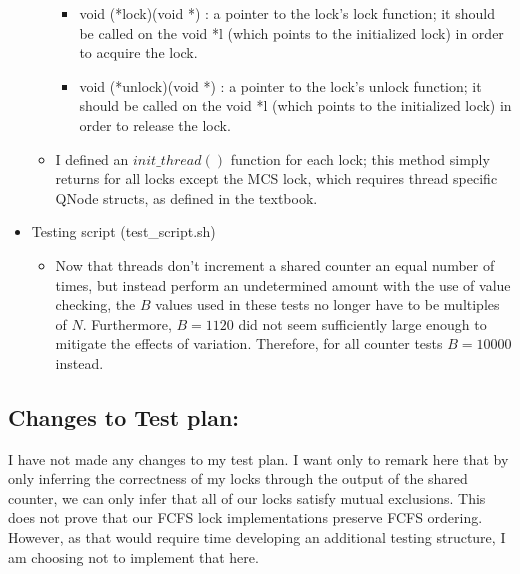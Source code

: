 \documentclass[]{article}
\begin{document}
\begin{itemize}
\begin{itemize}
\begin{itemize}
			\item void (*lock)(void *) : a pointer to the lock's lock function; it should be called on the void *l (which points to the initialized lock) in order to acquire the lock. 
			
			\item void (*unlock)(void *) : a pointer to the lock's unlock function; it should be called on the void *l (which points to the initialized lock) in order to release the lock. 
		\end{itemize}
		\item I defined an $init\_thread()$ function for each lock; this method simply returns for all locks except the MCS lock, which requires thread specific QNode structs, as defined in the textbook.
	\end{itemize}
	\item Testing script (test\_script.sh)
	\begin{itemize}
		\item Now that threads don't increment a shared counter an equal number of times, but instead perform an undetermined amount with the use of value checking, the $B$ values used in these tests no longer have to be multiples of $N$. Furthermore, $B = 1120$ did not seem sufficiently large enough to mitigate the effects of variation. Therefore, for all counter tests $B = 10000$ instead.
	\end{itemize}
\end{itemize}

\subsection{Changes to Test plan:}
I have not made any changes to my test plan. I want only to remark here that by only inferring the correctness of my locks through the output of the shared counter, we can only infer that all of our locks satisfy mutual exclusions. This does not prove that our FCFS lock implementations preserve FCFS ordering. However, as that would require time developing an additional testing structure, I am choosing not to implement that here.
\end{document}
